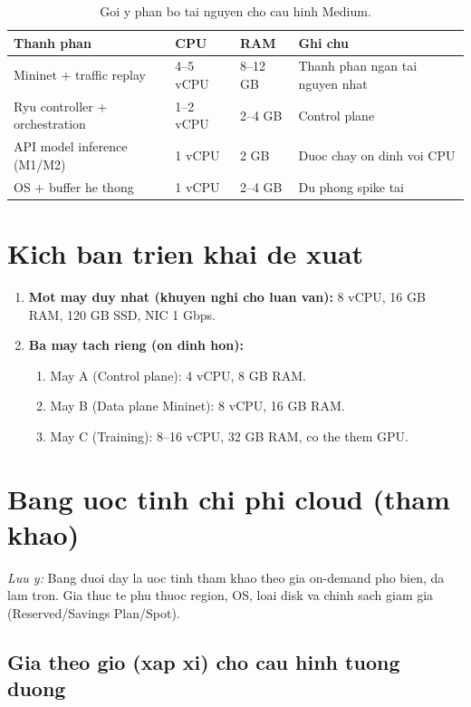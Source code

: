 \documentclass[12pt,a4paper]{article}
\begin{document}
\begin{table}[h!]
\centering
\renewcommand{\arraystretch}{1.2}
\begin{tabular}{p{6.0cm} p{3.0cm} p{3.0cm} p{3.0cm}}
\toprule
\textbf{Thanh phan} & \textbf{CPU} & \textbf{RAM} & \textbf{Ghi chu} \\
\midrule
Mininet + traffic replay & 4--5 vCPU & 8--12 GB & Thanh phan ngan tai nguyen nhat \\
Ryu controller + orchestration & 1--2 vCPU & 2--4 GB & Control plane \\
API model inference (M1/M2) & 1 vCPU & 2 GB & Duoc chay on dinh voi CPU \\
OS + buffer he thong & 1 vCPU & 2--4 GB & Du phong spike tai \\
\bottomrule
\end{tabular}
\caption{Goi y phan bo tai nguyen cho cau hinh Medium.}
\end{table}

\section{Kich ban trien khai de xuat}

\begin{enumerate}
	\item \textbf{Mot may duy nhat (khuyen nghi cho luan van):} 8 vCPU, 16 GB RAM, 120 GB SSD, NIC 1 Gbps.
	\item \textbf{Ba may tach rieng (on dinh hon):}
	\begin{enumerate}
		\item May A (Control plane): 4 vCPU, 8 GB RAM.
		\item May B (Data plane Mininet): 8 vCPU, 16 GB RAM.
		\item May C (Training): 8--16 vCPU, 32 GB RAM, co the them GPU.
	\end{enumerate}
\end{enumerate}

\section{Bang uoc tinh chi phi cloud (tham khao)}

\textit{Luu y:} Bang duoi day la uoc tinh tham khao theo gia on-demand pho bien, da lam tron. Gia thuc te phu thuoc region, OS, loai disk va chinh sach giam gia (Reserved/Savings Plan/Spot).

\subsection{Gia theo gio (xap xi) cho cau hinh tuong duong}
\end{document}
